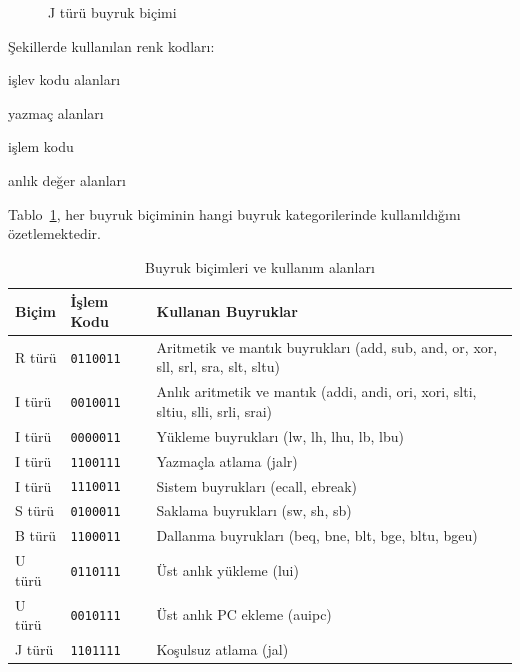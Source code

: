 \begin{figure}[H]
\centering
{}
\caption{J türü buyruk biçimi}
\label{fig:ekc-j-tipi}
\end{figure}

\vspace{0.5em}
\noindent
Şekillerde kullanılan renk kodları:\\[3pt]
\colorbox{blokgri}{\small\strut işlev kodu alanları}\quad
\colorbox{blokmavi}{\small\strut yazmaç alanları}\quad
\colorbox{blokyesil}{\small\strut işlem kodu}\quad
\colorbox{bloksari}{\small\strut anlık değer alanları}

\vspace{1em}
Tablo~\ref{tab:ekc-format-ozet}, her buyruk biçiminin hangi buyruk kategorilerinde kullanıldığını özetlemektedir.

\begin{table}[H]
\centering
\caption{Buyruk biçimleri ve kullanım alanları}\label{tab:ekc-format-ozet}
\begin{tabular}{llp{7cm}}
\toprule
\textbf{Biçim} & \textbf{İşlem Kodu} & \textbf{Kullanan Buyruklar} \\
\midrule
R türü & \texttt{0110011} & Aritmetik ve mantık buyrukları (add, sub, and, or, xor, sll, srl, sra, slt, sltu) \\
I türü & \texttt{0010011} & Anlık aritmetik ve mantık (addi, andi, ori, xori, slti, sltiu, slli, srli, srai) \\
I türü & \texttt{0000011} & Yükleme buyrukları (lw, lh, lhu, lb, lbu) \\
I türü & \texttt{1100111} & Yazmaçla atlama (jalr) \\
I türü & \texttt{1110011} & Sistem buyrukları (ecall, ebreak) \\
S türü & \texttt{0100011} & Saklama buyrukları (sw, sh, sb) \\
B türü & \texttt{1100011} & Dallanma buyrukları (beq, bne, blt, bge, bltu, bgeu) \\
U türü & \texttt{0110111} & Üst anlık yükleme (lui) \\
U türü & \texttt{0010111} & Üst anlık PC ekleme (auipc) \\
J türü & \texttt{1101111} & Koşulsuz atlama (jal) \\
\bottomrule
\end{tabular}
\end{table}


